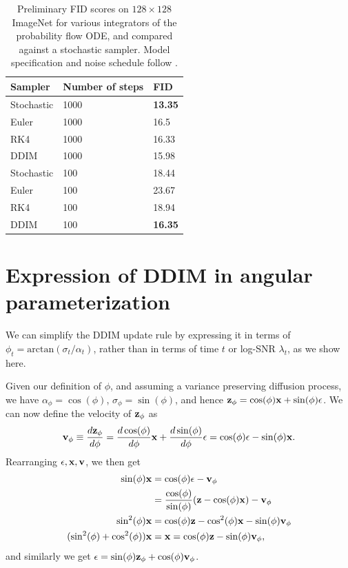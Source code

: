 \documentclass[hidelinks]{article} %
\begin{document}
\begin{table}[H]
    \centering
    \begin{tabular}{lll}
    Sampler & Number of steps & FID \\
    \hline
    Stochastic & 1000 & \textbf{13.35} \\
    Euler & 1000 & 16.5 \\
    RK4 & 1000 & 16.33 \\
    DDIM & 1000 & 15.98 \\
    \hline
    Stochastic & 100 & 18.44 \\
    Euler & 100 & 23.67 \\
    RK4 & 100 & 18.94 \\
    DDIM & 100 & \textbf{16.35}
    \end{tabular}
    \caption{Preliminary FID scores on $128\times128$ ImageNet for various integrators of the probability flow ODE, and compared against a stochastic sampler. Model specification and noise schedule follow \cite{ho2020denoising}.}
    \label{tab:ode_int}
\end{table}

\section{Expression of DDIM in angular parameterization}
\label{app:ddim_phi}
We can simplify the DDIM update rule by expressing it in terms of $\phi_{t} = \text{arctan}(\sigma_{t}/\alpha_{t})$, rather than in terms of time $t$ or log-SNR $\lambda_t$, as we show here.

Given our definition of $\phi$, and assuming a variance preserving diffusion process, we have $\alpha_{\phi} = \cos(\phi)$, $\sigma_{\phi}=\sin(\phi)$, and hence ${\mathbf{z}}_{\phi} = \cos(\phi){\mathbf{x}} + \sin(\phi){\mathbf{\epsilon}}$. We can now define the velocity of ${\mathbf{z}}_{\phi}$ as
\begin{align}
{\mathbf{v}}_\phi \equiv \frac{d {\mathbf{z}}_{\phi}}{d\phi} = \frac{d\cos(\phi)}{d\phi}{\mathbf{x}} + \frac{d\sin(\phi)}{d\phi}{\mathbf{\epsilon}} =\cos(\phi){\mathbf{\epsilon}} - \sin(\phi){\mathbf{x}}.
\end{align}
Rearranging ${\mathbf{\epsilon}}, {\mathbf{x}}, {\mathbf{v}}$, we then get
\begin{align}
\sin(\phi){\mathbf{x}} &= \cos(\phi){\mathbf{\epsilon}} - {\mathbf{v}}_{\phi}\\
&= \frac{\cos(\phi)}{\sin(\phi)}({\mathbf{z}} - \cos(\phi){\mathbf{x}}) - {\mathbf{v}}_{\phi}\\
\sin^{2}(\phi){\mathbf{x}} & = \cos(\phi){\mathbf{z}} - \cos^{2}(\phi){\mathbf{x}} - \sin(\phi){\mathbf{v}}_{\phi}\\
(\sin^{2}(\phi)+\cos^{2}(\phi)){\mathbf{x}} & = {\mathbf{x}} = \cos(\phi){\mathbf{z}} - \sin(\phi){\mathbf{v}}_{\phi},
\end{align}
and similarly we get $\epsilon = \sin(\phi) {\mathbf{z}}_{\phi} + \cos(\phi) {\mathbf{v}}_{\phi}$.
\end{document}
